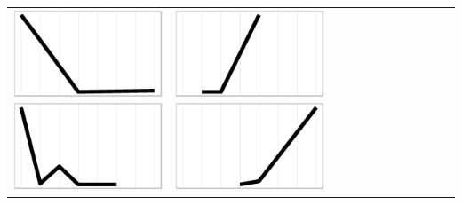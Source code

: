 \documentclass[conference]{worldcomp}
\begin{document}
\begin{table}
\begin{tabular}{ | b{1.5cm} | c | c | c | c | c | c | c | c | c | c | c |}
 \includegraphics[scale=0.08]{figures/cbaa.ps} &  
 \includegraphics[scale=0.08]{figures/bbcb.ps} &  

\end{tabular}
\end{table}
\end{document}

